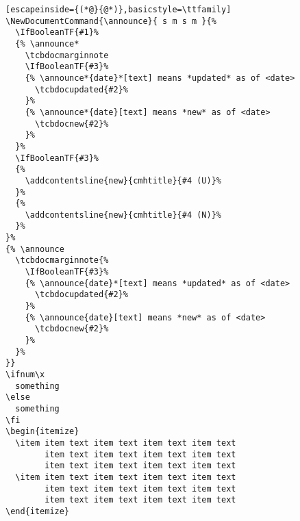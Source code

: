\documentclass[11pt]{article}
\begin{document}
\pagestyle{empty}
\pagecolor{black}
\begin{lstlisting}[escapeinside={(*@}{@*)},basicstyle=\ttfamily]
\NewDocumentCommand{\announce}{ s m s m }{%
  \IfBooleanTF{#1}%
  {% \announce*
    \tcbdocmarginnote
    \IfBooleanTF{#3}%
    {% \announce*{date}*[text] means *updated* as of <date>
      \tcbdocupdated{#2}%
    }%
    {% \announce*{date}[text] means *new* as of <date>
      \tcbdocnew{#2}%
    }%
  }%
  \IfBooleanTF{#3}%
  {%
    \addcontentsline{new}{cmhtitle}{#4 (U)}%
  }%
  {%
    \addcontentsline{new}{cmhtitle}{#4 (N)}%
  }%
}%
{% \announce
  \tcbdocmarginnote{%
    \IfBooleanTF{#3}%
    {% \announce{date}*[text] means *updated* as of <date>
      \tcbdocupdated{#2}%
    }%
    {% \announce{date}[text] means *new* as of <date>
      \tcbdocnew{#2}%
    }%
  }%
}}
\ifnum\x
  something
\else
  something
\fi
\begin{itemize}
  \item item text item text item text item text
        item text item text item text item text
        item text item text item text item text
  \item item text item text item text item text
        item text item text item text item text
        item text item text item text item text
\end{itemize}
\end{lstlisting}
\end{document}
